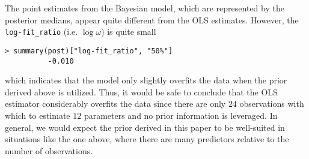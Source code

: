 \documentclass[11pt]{article}
\begin{document}
The point estimates from the Bayesian model, which are represented by the
posterior medians, appear quite different from the OLS estimates. However, the
{\tt log-fit\_ratio} (i.e. $\log{\omega}$) is quite small

\begin{lstlisting}
> summary(post)["log-fit_ratio", "50%"]
          -0.010
\end{lstlisting}

which indicates that the model only slightly overfits the data when the prior
derived above is utilized. Thus, it would be safe to conclude that the OLS
estimator considerably overfits the data since there are only $24$ observations
with which to estimate $12$ parameters and no prior information is leveraged. In
general, we would expect the prior derived in this paper to be well-suited in
situations like the one above, where there are many predictors relative to the
number of observations.



\end{document}
